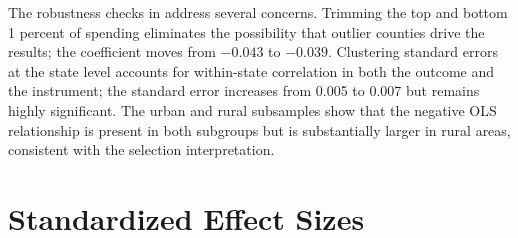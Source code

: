 \documentclass[12pt]{article}
\begin{document}
The robustness checks in  address several concerns. Trimming the top and bottom 1 percent of spending eliminates the possibility that outlier counties drive the results; the coefficient moves from $-0.043$ to $-0.039$. Clustering standard errors at the state level accounts for within-state correlation in both the outcome and the instrument; the standard error increases from 0.005 to 0.007 but remains highly significant. The urban and rural subsamples show that the negative OLS relationship is present in both subgroups but is substantially larger in rural areas, consistent with the selection interpretation.

\section{Standardized Effect Sizes}
\label{sec:sde}


\end{document}
